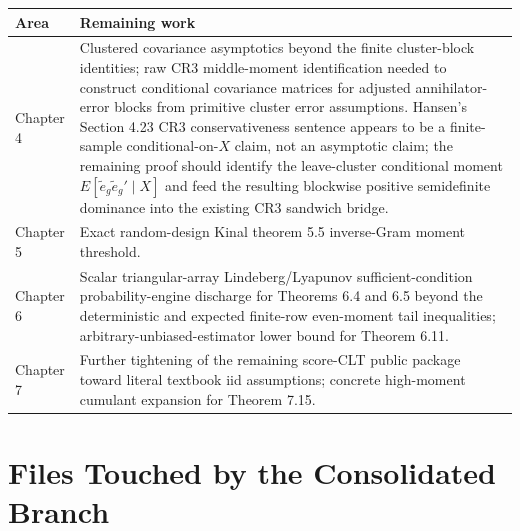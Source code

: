 \documentclass[11pt]{article}
\begin{document}
\begin{longtable}{p{}p{}}
\toprule
Area & Remaining work \\
\midrule
Chapter 4 & Clustered covariance asymptotics beyond the finite cluster-block
identities; raw CR3 middle-moment identification needed to construct conditional
covariance matrices for adjusted annihilator-error blocks from primitive cluster
error assumptions. Hansen's Section 4.23 CR3 conservativeness sentence appears
to be a finite-sample conditional-on-\(X\) claim, not an asymptotic claim; the
remaining proof should identify the leave-cluster conditional moment
\(E[\tilde e_g \tilde e_g' \mid X]\) and feed the resulting blockwise positive
semidefinite dominance into the existing CR3 sandwich bridge. \\
Chapter 5 & Exact random-design Kinal theorem 5.5 inverse-Gram moment threshold. \\
Chapter 6 & Scalar triangular-array Lindeberg/Lyapunov sufficient-condition
probability-engine discharge for Theorems 6.4 and 6.5 beyond the deterministic
and expected finite-row even-moment tail inequalities; arbitrary-unbiased-estimator
lower bound for Theorem 6.11. \\
Chapter 7 & Further tightening of the remaining score-CLT public package toward
literal textbook iid assumptions; concrete high-moment cumulant expansion for
Theorem 7.15. \\
\bottomrule
\end{longtable}

\section{Files Touched by the Consolidated Branch}
\end{document}
